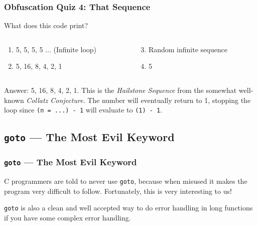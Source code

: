 \documentclass[xcolor]{beamer}
\begin{document}
\begin{frame}
	\frametitle{Obfuscation Quiz 4: That Sequence}
	\pause
	
	What does this code print?
	
	
	\pause
	
	\begin{columns}
		\begin{column}{0.45\textwidth}
			\begin{enumerate}
				\item 5, 5, 5, 5 ... (Infinite loop)
				\pause
				\item 5, 16, 8, 4, 2, 1
			\end{enumerate}
		\end{column}
		\pause
		\begin{column}{0.45\textwidth}
			\begin{enumerate}
				\setcounter{enumi}{2}
				\item Random infinite sequence
				\pause
				\item 5
			\end{enumerate}
		\end{column}
	\end{columns}
	\pause
	
	\vspace{0.5cm}
	
	Answer: 5, 16, 8, 4, 2, 1. \pause This is the \textit{Hailstone Sequence} from the somewhat well-known \textit{Collatz Conjecture}. \pause The number will eventually return to 1, stopping the loop since \texttt{(n = ...) - 1} will evaluate to \texttt{(1) - 1}.
\end{frame}

\subsection{\texttt{goto} --- The Most Evil Keyword}

\begin{frame}
	\frametitle{\texttt{goto} --- The Most Evil Keyword}
	\pause
	
	\small
	C programmers are told to never use \texttt{goto}, because when misused it makes the program very difficult to follow. Fortunately, this is very interesting to us!
	\pause
	
	\texttt{goto} is also a clean and well accepted way to do error handling in long functions if you have some complex error handling.
	
	
\end{frame}
\end{document}
